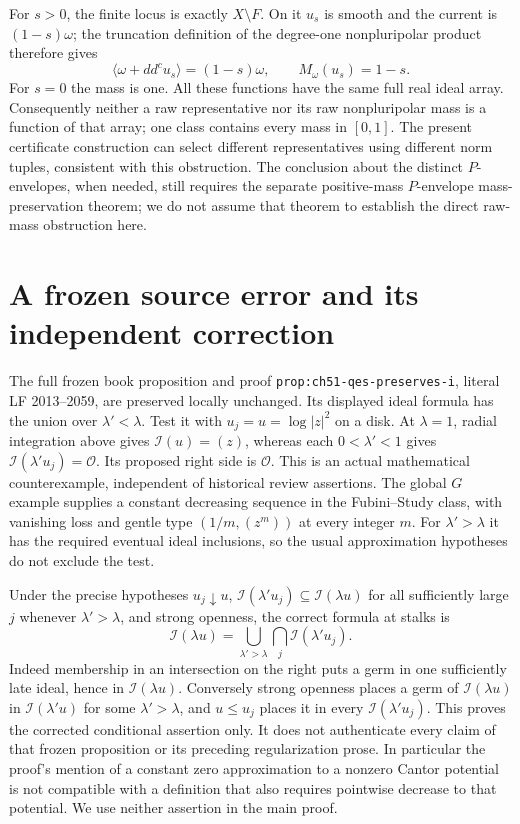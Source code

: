 \documentclass[11pt]{article}
\newcommand{\I}{\mathcal I}
\newcommand{\OO}{\mathcal O}
\theoremstyle{definition}
\begin{document}
For $s>0$, the finite locus is exactly $X\setminus F$. On it
$u_s$ is smooth and the current is $(1-s)\omega$; the truncation
definition of the degree-one nonpluripolar product therefore gives
\[
 \langle\omega+dd^cu_s\rangle=(1-s)\omega,
 \qquad M_\omega(u_s)=1-s.
\]
For $s=0$ the mass is one. All these functions have the same
full real ideal array. Consequently neither a raw representative
nor its raw nonpluripolar mass is a function of that array; one
class contains every mass in $[0,1]$. The present certificate
construction can select different representatives using different
norm tuples, consistent with this obstruction. The conclusion
about the distinct $P$-envelopes, when needed, still requires the
separate positive-mass $P$-envelope mass-preservation theorem;
we do not assume that theorem to establish the direct raw-mass
obstruction here.

\section{A frozen source error and its independent correction}\label{sec:defect}
The full frozen book proposition and proof
\texttt{prop:ch51-qes-preserves-i}, literal LF 2013--2059, are
preserved locally unchanged. Its displayed ideal formula has
the union over $\lambda'<\lambda$. Test it with
$u_j=u=\log|z|^2$ on a disk. At $\lambda=1$, radial integration
above gives $\I(u)=(z)$, whereas each $0<\lambda'<1$ gives
$\I(\lambda'u_j)=\OO$. Its proposed right side is $\OO$.
This is an actual mathematical counterexample, independent of
historical review assertions. The global $G$ example supplies
a constant decreasing sequence in the Fubini--Study class, with
vanishing loss and gentle type $(1/m,(z^m))$ at every integer $m$.
For $\lambda'>\lambda$ it has the required eventual ideal
inclusions, so the usual approximation hypotheses do not exclude
the test.

Under the precise hypotheses $u_j\downarrow u$,
$\I(\lambda'u_j)\subseteq\I(\lambda u)$ for all sufficiently
large $j$ whenever $\lambda'>\lambda$, and strong openness, the
correct formula at stalks is
\begin{equation}\label{eq:corrected}
 \I(\lambda u)=
 \bigcup_{\lambda'>\lambda}\bigcap_j\I(\lambda'u_j).
\end{equation}
Indeed membership in an intersection on the right puts a germ
in one sufficiently late ideal, hence in $\I(\lambda u)$.
Conversely strong openness places a germ of $\I(\lambda u)$ in
$\I(\lambda'u)$ for some $\lambda'>\lambda$, and $u\leq u_j$
places it in every $\I(\lambda'u_j)$. This proves the corrected
conditional assertion only. It does not authenticate every
claim of that frozen proposition or its preceding regularization
prose. In particular the proof's mention of a constant zero
approximation to a nonzero Cantor potential is not compatible
with a definition that also requires pointwise decrease to that
potential. We use neither assertion in the main proof.
\end{document}
